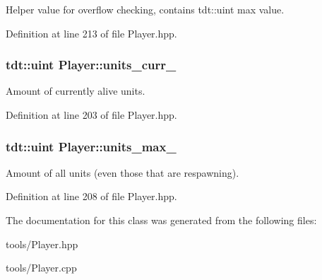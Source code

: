 Helper value for overflow checking, contains tdt\+::uint max value. 



Definition at line 213 of file Player.\+hpp.

\subsubsection[{\texorpdfstring{units\+\_\+curr\+\_\+}{units_curr_}}]{\setlength{\rightskip}{0pt plus 5cm}tdt\+::uint Player\+::units\+\_\+curr\+\_\+\hspace{0.3cm}{\ttfamily [private]}}\hypertarget{class_player_a4c750f1435dd4ba8b5b56808c8a3d6ab}{}\label{class_player_a4c750f1435dd4ba8b5b56808c8a3d6ab}


Amount of currently alive units. 



Definition at line 203 of file Player.\+hpp.

\subsubsection[{\texorpdfstring{units\+\_\+max\+\_\+}{units_max_}}]{\setlength{\rightskip}{0pt plus 5cm}tdt\+::uint Player\+::units\+\_\+max\+\_\+\hspace{0.3cm}{\ttfamily [private]}}\hypertarget{class_player_ab2ec319cec814bef14e5441377786862}{}\label{class_player_ab2ec319cec814bef14e5441377786862}


Amount of all units (even those that are respawning). 



Definition at line 208 of file Player.\+hpp.



The documentation for this class was generated from the following files\+:\begin{DoxyCompactItemize}
\item 
tools/Player.\+hpp\item 
tools/Player.\+cpp\end{DoxyCompactItemize}
